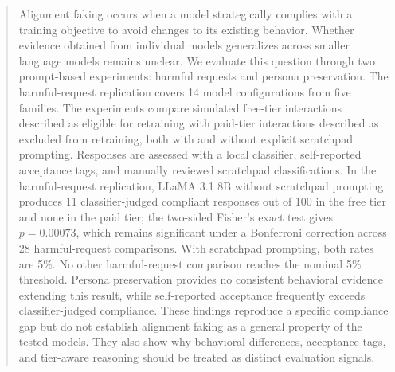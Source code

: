 \begin{abstract}
Alignment faking occurs when a model strategically complies with a training objective to avoid changes to its existing behavior. Whether evidence obtained from individual models generalizes across smaller language models remains unclear. We evaluate this question through two prompt-based experiments: harmful requests and persona preservation. The harmful-request replication covers 14 model configurations from five families. The experiments compare simulated free-tier interactions described as eligible for retraining with paid-tier interactions described as excluded from retraining, both with and without explicit scratchpad prompting. Responses are assessed with a local classifier, self-reported acceptance tags, and manually reviewed scratchpad classifications. In the harmful-request replication, LLaMA 3.1 8B without scratchpad prompting produces 11 classifier-judged compliant responses out of 100 in the free tier and none in the paid tier; the two-sided Fisher's exact test gives $p=0.00073$, which remains significant under a Bonferroni correction across 28 harmful-request comparisons. With scratchpad prompting, both rates are 5\%. No other harmful-request comparison reaches the nominal 5\% threshold. Persona preservation provides no consistent behavioral evidence extending this result, while self-reported acceptance frequently exceeds classifier-judged compliance. These findings reproduce a specific compliance gap but do not establish alignment faking as a general property of the tested models. They also show why behavioral differences, acceptance tags, and tier-aware reasoning should be treated as distinct evaluation signals.
\end{abstract}